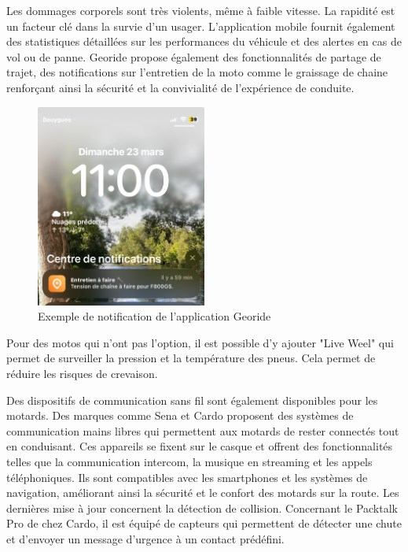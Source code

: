 Les dommages corporels sont très violents, même à faible vitesse. La rapidité est un facteur clé dans la survie d'un usager. L’application mobile fournit également des statistiques détaillées sur les performances du véhicule et des alertes en cas de vol ou de panne. Georide propose également des fonctionnalités de partage de trajet, des notifications sur l'entretien de la moto comme le graissage de chaine renforçant ainsi la sécurité et la convivialité de l’expérience de conduite.
\begin{figure}[H]
    \centering
    \includegraphics[width=0.5\textwidth]{images/notification_georide.jpg} 
    \caption{Exemple de notification de l'application Georide}
\end{figure}
Pour des motos qui n'ont pas l'option, il est possible d'y ajouter "Live Weel" qui permet de surveiller la pression et la température des pneus. Cela permet de réduire les risques de crevaison.
\vspace{0.5cm}

Des dispositifs de communication sans fil sont également disponibles pour les motards. Des marques comme Sena et Cardo\cite{cardo} proposent des systèmes de communication mains libres qui permettent aux motards de rester connectés tout en conduisant. Ces appareils se fixent sur le casque et offrent des fonctionnalités telles que la communication intercom, la musique en streaming et les appels téléphoniques. Ils sont compatibles avec les smartphones et les systèmes de navigation, améliorant ainsi la sécurité et le confort des motards sur la route. Les dernières mise à jour concernent la détection de collision. Concernant le Packtalk Pro de chez Cardo, il est équipé de capteurs qui permettent de détecter une chute et d'envoyer un message d'urgence à un contact prédéfini.


